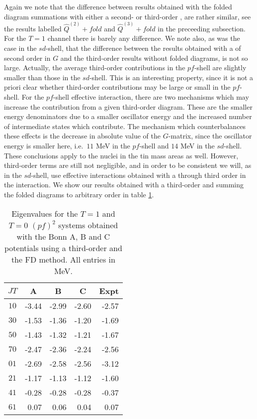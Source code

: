 Again we note
that the difference between results obtained with the folded
diagram summations with either a second- or third-order \qbox,
are rather similar, see the results
labelled $\hat{Q}^{(2)}+fold$ and $\hat{Q}^{(3)}+fold$ in the preceeding
subsection.
For the $T=1$ channel there is barely any difference. We note also,
as was the case in the $sd$-shell, that the difference between
the results obtained with a \qbox of second order in $G$ and the
third-order results without folded diagrams, is not so large.
Actually, the average third-order contributions
in the $pf$-shell are slightly smaller than
those in the $sd$-shell.
This is an interesting property, since it is not a priori clear
whether third-order contributions may be large or small in the
$pf$-shell. For the $pf$-shell effective interaction, there are
two mechanisms which may increase the contribution from a given
third-order diagram. These are the smaller energy denominators
due to a smaller oscillator energy and the increased
number of intermediate states which contribute. The mechanism
which counterbalances these effects is the decrease in absolute
value of the $G$-matrix, since the oscillator energy is smaller
here, i.e.\ $11$ MeV in the $pf$-shell and $14$ MeV in the
$sd$-shell. These conclusions apply to the nuclei in the
tin mass areas as well. However, third-order
terms are still not negligible, and in order to be
consistent we will, as in the $sd$-shell, use effective
interactions obtained with a \qbox through third order in the
interaction.
We show our results obtained with a third-order \qbox and summing
the folded diagrams to arbitrary order in table \ref{tab:casc}.
\begin{table}[hbtp]
\caption{Eigenvalues for the $T=1$ and $T=0$ $(pf)^2$ systems
obtained with
the Bonn A, B and C potentials using a third-order \qbox
and the FD method.
All entries in MeV.}
\begin{center}
\begin{tabular}{crrrr}
\\\hline
$JT$&
\multicolumn{1}{c}{A}&
\multicolumn{1}{c}{B}&
\multicolumn{1}{c}{C}&
\multicolumn{1}{c}{Expt}
\\\hline
$10$&-3.44&-2.99&-2.60&-2.57\\
$30$&-1.53&-1.36&-1.20&-1.69\\
$50$&-1.43&-1.32&-1.21&-1.67\\
$70$&-2.47&-2.36&-2.24&-2.56\\
$01$&-2.69&-2.58&-2.56&-3.12\\
$21$&-1.17&-1.13&-1.12&-1.60\\
$41$&-0.28&-0.28&-0.28&-0.37\\
$61$&0.07&0.06&0.04 &0.07\\
\hline
\end{tabular}
\end{center}
\label{tab:casc}
\end{table}

